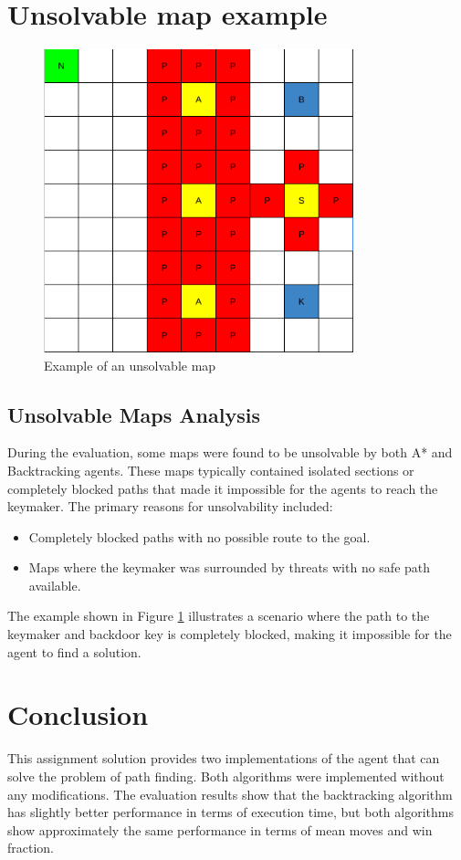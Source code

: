 \documentclass[12pt]{article}
\begin{document}
\section{Unsolvable map example}
\begin{figure}[H]
    \centering
    \includegraphics[width=0.8\textwidth]{unsolvable_map.png}
    \caption{Example of an unsolvable map}
    \label{fig:unsolvable_map}
\end{figure}

\subsection{Unsolvable Maps Analysis}
During the evaluation, some maps were found to be unsolvable by both A* and
Backtracking agents. These maps typically contained isolated sections or
completely blocked paths that made it impossible for the agents to reach the
keymaker. The primary reasons for unsolvability included:

\begin{itemize}
    \item Completely blocked paths with no possible route to the goal.
    \item Maps where the keymaker was surrounded by threats with no safe path available.
\end{itemize}
\noindent
The example shown in Figure \ref{fig:unsolvable_map} illustrates a scenario where the path to the keymaker and backdoor key is completely blocked, making it impossible for the agent to find a solution.
\section{Conclusion}
This assignment solution provides two implementations of the agent that can
solve the problem of path finding. Both algorithms were implemented without any
modifications. The evaluation results show that the backtracking algorithm has
slightly better performance in terms of execution time, but both algorithms
show approximately the same performance in terms of mean moves and win
fraction.
\end{document}

